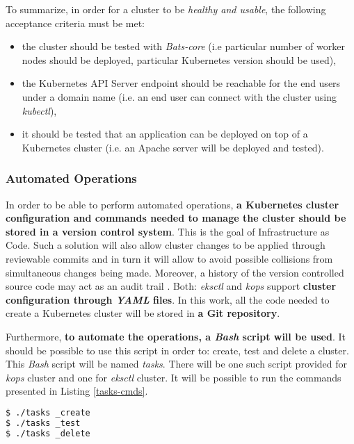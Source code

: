 To summarize, in order for a cluster to be \textit{healthy and usable}, the following acceptance criteria must be met:
\begin{itemize}
\item the cluster should be tested with \textit{Bats-core} (i.e particular number of worker nodes should be deployed, particular Kubernetes version should be used),
\item the Kubernetes API Server endpoint should be reachable for the end users under a domain name (i.e. an end user can connect with the cluster using \textit{kubectl}),
\item it should be tested that an application can be deployed on top of a Kubernetes cluster (i.e. an Apache server will be deployed and tested).
\end{itemize}

\subsubsection{Automated Operations}

In order to be able to perform automated operations, \textbf{a Kubernetes cluster configuration and commands needed to manage the cluster should be stored in a version control system}. This is the goal of Infrastructure as Code. Such a solution will also allow cluster changes to be applied through reviewable commits and in turn it will allow to avoid possible collisions from simultaneous changes being made. Moreover, a history of the version controlled source code may act as an audit trail \cite{online-kops-ci,online-kops-manifest}. Both: \textit{eksctl} and \textit{kops} support \textbf{cluster configuration through \textit{YAML} files}. In this work, all the code needed to create a Kubernetes cluster will be stored in \textbf{a Git repository}.

Furthermore, \textbf{to automate the operations, a \textit{Bash} script will be used}. It should be possible to use this script in order to: create, test and delete a cluster. This \textit{Bash} script will be named \textit{tasks}. There will be one such script provided for \textit{kops} cluster and one for \textit{eksctl} cluster. It will be possible to run the commands presented in Listing \ref{tasks-cmds}.
\begin{lstlisting}[basicstyle=\scriptsize,caption={Commands provided by tasks file -- a \textit{Bash} script which automates a~Kubernetes cluster operations},captionpos=b,language=Bash,xleftmargin=1cm,label=tasks-cmds]
$ ./tasks _create
$ ./tasks _test
$ ./tasks _delete
\end{lstlisting}

